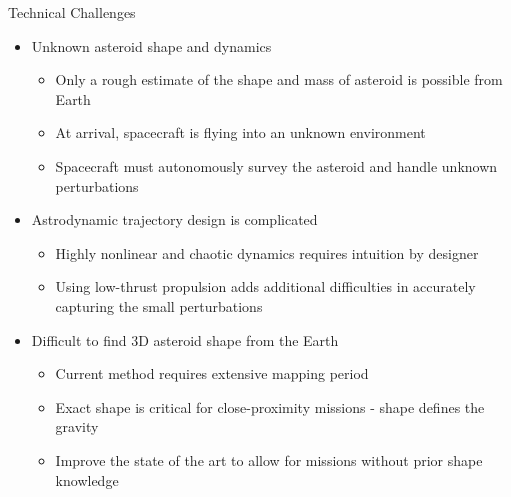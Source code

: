 \documentclass[final, usenames, dvipsnames]{beamer}
\newlength{\onecolwidth}
\begin{document}
\begin{frame}[t]
\begin{columns}[T,onlytextwidth]
\begin{column}{\onecolwidth}
        \begin{block}{Technical Challenges}
            \begin{itemize}
                \item Unknown asteroid shape and dynamics
                    \begin{itemize}
                        \item Only a rough estimate of the shape and mass of asteroid is possible from Earth
                        \item At arrival, spacecraft is flying into an unknown environment 
                        \item Spacecraft must autonomously survey the asteroid and handle unknown perturbations
                    \end{itemize}
                \item Astrodynamic trajectory design is complicated
                    \begin{itemize}
                        \item Highly nonlinear and chaotic dynamics requires intuition by designer
                        \item Using low-thrust propulsion adds additional difficulties in accurately capturing the small perturbations
                    \end{itemize}
                \item Difficult to find 3D asteroid shape from the Earth
                    \begin{itemize}
                        \item Current method requires extensive mapping period
                        \item Exact shape is critical for close-proximity missions - shape defines the gravity
                        \item Improve the state of the art to allow for missions without prior shape knowledge
                    \end{itemize}
            \end{itemize}
            \vspace*{0.2cm}
        \end{block} 


\end{column}
\end{columns}
\end{frame}
\end{document}
